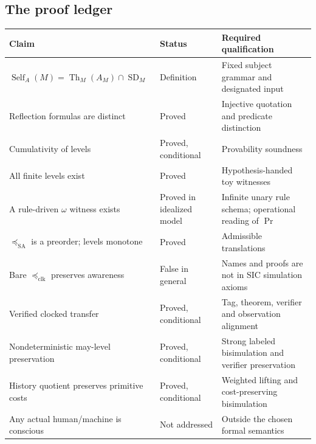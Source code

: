\documentclass[11pt,letterpaper]{article}
\theoremstyle{definition}\newtheorem{definition}[theorem]{Definition}\newtheorem{example}[theorem]{Example}\newtheorem{protocol}[theorem]{Protocol}\newtheorem{question}[theorem]{Open Problem}
\theoremstyle{remark}\newtheorem{remark}[theorem]{Remark}
\newcommand{\Th}{\operatorname{Th}}
\newcommand{\Self}{\operatorname{Self}}
\newcommand{\SD}{\operatorname{SD}}
\newcommand{\Prov}{\operatorname{Pr}}
\newcommand{\clksim}{\preceq_{\mathrm{clk}}}
\newcommand{\sas}{\preceq_{\mathrm{SA}}}
\begin{document}
\subsection{The proof ledger}
\begin{center}\small\begin{tabularx}{\textwidth}{@{}p{}p{}X@{}}\toprule
Claim & Status & Required qualification \\\midrule
$\Self_A(M)=\Th_M(A_M)\cap\SD_M$ & Definition & Fixed subject grammar and designated input \\
Reflection formulas are distinct & Proved & Injective quotation and predicate distinction \\
Cumulativity of levels & Proved, conditional & Provability soundness \\
All finite levels exist & Proved & Hypothesis-handed toy witnesses \\
A rule-driven $\omega$ witness exists & Proved in idealized model & Infinite unary rule schema; operational reading of $\Prov$ \\
$\sas$ is a preorder; levels monotone & Proved & Admissible translations \\
Bare $\clksim$ preserves awareness & False in general & Names and proofs are not in SIC simulation axioms \\
Verified clocked transfer & Proved, conditional & Tag, theorem, verifier and observation alignment \\
Nondeterministic may-level preservation & Proved, conditional & Strong labeled bisimulation and verifier preservation \\
History quotient preserves primitive costs & Proved, conditional & Weighted lifting and cost-preserving bisimulation \\
Any actual human/machine is conscious & Not addressed & Outside the chosen formal semantics \\
\bottomrule\end{tabularx}\end{center}
\end{document}
